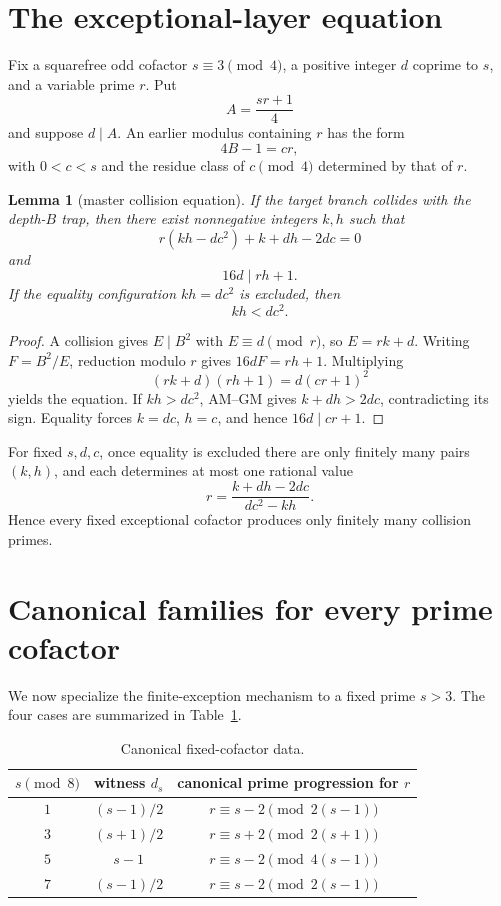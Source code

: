 \documentclass[11pt]{article}
\newtheorem{lemma}[theorem]{Lemma}
\theoremstyle{definition}
\begin{document}
\section{The exceptional-layer equation}
Fix a squarefree odd cofactor $s\equiv3\pmod4$, a positive integer $d$ coprime to $s$, and a variable prime $r$. Put
\[
A=\frac{sr+1}{4}
\]
and suppose $d\mid A$. An earlier modulus containing $r$ has the form
\[
4B-1=cr,
\]
with $0<c<s$ and the residue class of $c\pmod4$ determined by that of $r$.

\begin{lemma}[master collision equation]\label{lem:master}
If the target branch collides with the depth-$B$ trap, then there exist nonnegative integers $k,h$ such that
\[
\boxed{r(kh-dc^2)+k+dh-2dc=0}
\]
and
\[
16d\mid rh+1.
\]
If the equality configuration $kh=dc^2$ is excluded, then
\[
\boxed{kh<dc^2.}
\]
\end{lemma}

\begin{proof}
A collision gives $E\mid B^2$ with $E\equiv d\pmod r$, so $E=rk+d$. Writing $F=B^2/E$, reduction modulo $r$ gives $16dF=rh+1$. Multiplying
\[
(rk+d)(rh+1)=d(cr+1)^2
\]
yields the equation. If $kh>dc^2$, AM--GM gives $k+dh>2dc$, contradicting its sign. Equality forces $k=dc$, $h=c$, and hence $16d\mid cr+1$.
\end{proof}

For fixed $s,d,c$, once equality is excluded there are only finitely many pairs $(k,h)$, and each determines at most one rational value
\[
r=\frac{k+dh-2dc}{dc^2-kh}.
\]
Hence every fixed exceptional cofactor produces only finitely many collision primes.

\section{Canonical families for every prime cofactor}
We now specialize the finite-exception mechanism to a fixed prime $s>3$. The four cases are summarized in Table~\ref{tab:canonical}.

\begin{table}[h]
\centering
\begin{tabular}{c|c|c}
$s\pmod8$ & witness $d_s$ & canonical prime progression for $r$ \\
\hline
$1$ & $(s-1)/2$ & $r\equiv s-2\pmod{2(s-1)}$ \\
$3$ & $(s+1)/2$ & $r\equiv s+2\pmod{2(s+1)}$ \\
$5$ & $s-1$ & $r\equiv s-2\pmod{4(s-1)}$ \\
$7$ & $(s-1)/2$ & $r\equiv s-2\pmod{2(s-1)}$
\end{tabular}
\caption{Canonical fixed-cofactor data.}
\label{tab:canonical}
\end{table}
\end{document}
